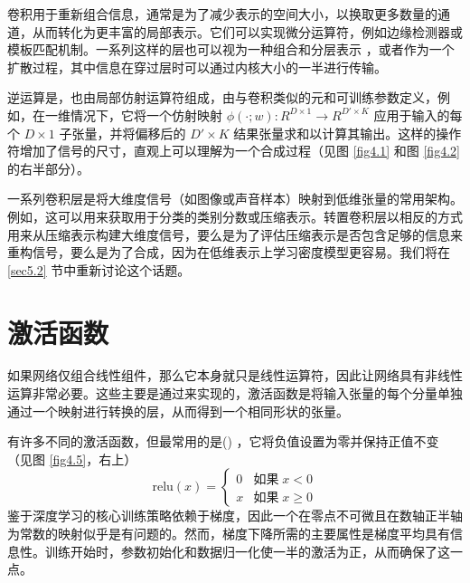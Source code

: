 卷积用于重新组合信息，通常是为了减少表示的空间大小，以换取更多数量的通道，从而转化为更丰富的局部表示。它们可以实现微分运算符，例如边缘检测器或模板匹配机制。一系列这样的层也可以视为一种组合和分层表示 \citep{arxiv-1311.2901}，或者作为一个扩散过程，其中信息在穿过层时可以通过内核大小的一半进行传输。

逆运算是，也由局部仿射运算符组成，由与卷积类似的元和可训练参数定义，例如，在一维情况下，它将一个仿射映射 $\phi(\cdot;w):R^{D \times 1} \to R^{D' \times K}$ 应用于输入的每个 $D \times 1$ 子张量，并将偏移后的 $D' \times K$ 结果张量求和以计算其输出。这样的操作符增加了信号的尺寸，直观上可以理解为一个合成过程（见图 \ref{fig4.1} 和图 \ref{fig4.2} 的右半部分）。

一系列卷积层是将大维度信号（如图像或声音样本）映射到低维张量的常用架构。例如，这可以用来获取用于分类的类别分数或压缩表示。转置卷积层以相反的方式用来从压缩表示构建大维度信号，要么是为了评估压缩表示是否包含足够的信息来重构信号，要么是为了合成，因为在低维表示上学习密度模型更容易。我们将在 \ref{sec5.2} 节中重新讨论这个话题。

\section{激活函数}\label{sec4.3}

如果网络仅组合线性组件，那么它本身就只是线性运算符，因此让网络具有非线性运算非常必要。这些主要是通过来实现的，激活函数是将输入张量的每个分量单独通过一个映射进行转换的层，从而得到一个相同形状的张量。

有许多不同的激活函数，但最常用的是() \citep{glorot11a}，它将负值设置为零并保持正值不变（见图 \ref{fig4.5}，右上）
$$
\text{relu}(x) = \begin{cases}
    0 &\text{如果}\; x < 0 \\
    x &\text{如果}\; x \ge 0
 \end{cases}
 $$
 鉴于深度学习的核心训练策略依赖于梯度，因此一个在零点不可微且在数轴正半轴为常数的映射似乎是有问题的。然而，梯度下降所需的主要属性是梯度平均具有信息性。训练开始时，参数初始化和数据归一化使一半的激活为正，从而确保了这一点。

